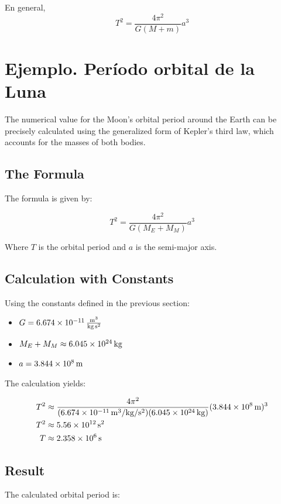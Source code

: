 \documentclass[11pt,a4paper]{book}
\begin{document}
En general,%
$$T^2 = \frac{4\pi^2}{G(M + m)} a^3$$


\section*{Ejemplo. Período orbital de la Luna}

The numerical value for the Moon's orbital period around the Earth can be precisely calculated using the generalized form of Kepler's third law, which accounts for the masses of both bodies.

\subsection*{The Formula}
The formula is given by:

$$T^2 = \frac{4\pi^2}{G(M_E + M_M)} a^3$$

Where $T$ is the orbital period and $a$ is the semi-major axis.

\subsection*{Calculation with Constants}
Using the constants defined in the previous section:

\begin{itemize}
    \item $G = \SI{6.674E-11}{\cubic\metre\per\kilogram\per\square\second}$
    \item $M_E + M_M \approx \SI{6.045E24}{\kilogram}$
    \item $a = \SI{3.844E8}{\metre}$
\end{itemize}

The calculation yields:

\begin{align*}
    T^2 &\approx \frac{4\pi^2}{(\SI{6.674E-11}{\meter^3\per\kilogram\per\second\squared})(\SI{6.045E24}{\kilogram})} (\SI{3.844E8}{\meter})^3 \\
    T^2 &\approx \SI{5.56E12}{\square\second} \\
    T &\approx \SI{2.358E6}{\second}
\end{align*}

\subsection*{Result}
The calculated orbital period is:
\end{document}
